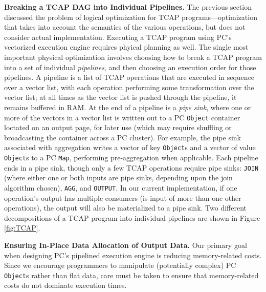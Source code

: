 \vspace{5 pt}
\noindent
\textbf{Breaking a TCAP DAG into Individual Pipelines.}
The previous section discussed the problem of logical optimization for TCAP programs---optimization that takes into account the semantics
of the various operations, but does not consider actual implementation.  
Executing a TCAP program using PC's vectorized execution engine requires phyical planning as well.  The single most important physical 
optimization involves choosing how to break a TCAP program into a set of individual \emph{pipelines}, and then choosing an execution order
for those pipelines.
A pipeline is a list of TCAP operations that are executed in sequence over a vector list, with each operation performing some
transformation over the vector list; at all times as the vector list is pushed through the pipeline, it remains buffered in RAM.  
At the end of a pipeline is a \emph{pipe sink}, where one or more of the
vectors in a vector list is written out to a PC \texttt{Object}
container loctated on an output page, for later use (which may require shuffling or broadcasting the container across a PC cluster).  
For example, the pipe sink associated with aggregation
writes a vector of key \texttt{Object}s and a vector of value \texttt{Object}s to a PC \texttt{Map}, performing pre-aggregation when
applicable.
Each pipeline ends in a pipe sink, though only a few TCAP operations require pipe sinks: \texttt{JOIN} (where either one or both inputs are pipe
sinks, depending upon the join algorithm chosen), \texttt{AGG}, and
\texttt{OUTPUT}. In our current implementation, if one operation's
output has multiple consumers (is input of more than one other operations), the output will also be
materialized to a pipe sink.
Two different decompositions of a TCAP program into individual pipelines are shown in Figure \ref{fig:TCAP}.



\vspace{5 pt}
\noindent
\textbf{Ensuring In-Place Data Allocation of Output Data.}
Our primary goal when designing PC's pipelined execution engine is reducing  
memory-related costs.  
Since we 
encourage programmers to manipulate (potentially complex) PC \texttt{Object}s
rather than flat data, care must be taken to ensure that memory-related costs do
not dominate execution times.

